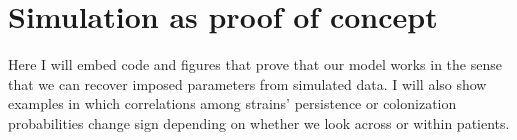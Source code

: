 \documentclass{article}
\begin{document}
\section*{Simulation as proof of concept}

Here I will embed code and figures that prove that our model works in the sense that we can recover imposed parameters from simulated data. I will also show examples in which correlations among strains' persistence or colonization probabilities change sign depending on whether we look across or within patients. 
\end{document}
